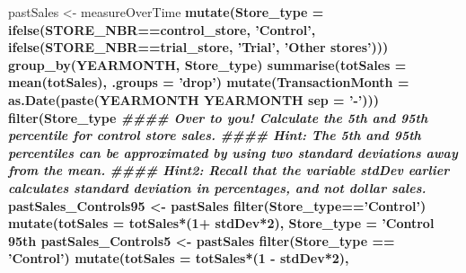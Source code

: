 \documentclass[]{article}
\newenvironment{Shaded}{\begin{snugshade}}{\end{snugshade}}
\newcommand{\CommentTok}[1]{\textcolor[rgb]{0.56,0.35,0.01}{\textit{#1}}}
\newcommand{\DataTypeTok}[1]{\textcolor[rgb]{0.13,0.29,0.53}{#1}}
\newcommand{\DecValTok}[1]{\textcolor[rgb]{0.00,0.00,0.81}{#1}}
\newcommand{\KeywordTok}[1]{\textcolor[rgb]{0.13,0.29,0.53}{\textbf{#1}}}
\newcommand{\NormalTok}[1]{#1}
\newcommand{\OperatorTok}[1]{\textcolor[rgb]{0.81,0.36,0.00}{\textbf{#1}}}
\newcommand{\StringTok}[1]{\textcolor[rgb]{0.31,0.60,0.02}{#1}}
\begin{document}
\begin{Shaded}
\begin{Highlighting}[]
\NormalTok{pastSales <-}\StringTok{ }\NormalTok{measureOverTime }\OperatorTok{%
\StringTok{  }\KeywordTok{mutate}\NormalTok{(}\DataTypeTok{Store_type =} \KeywordTok{ifelse}\NormalTok{(STORE_NBR}\OperatorTok{==}\NormalTok{control_store, }\StringTok{'Control'}\NormalTok{,}
                             \KeywordTok{ifelse}\NormalTok{(STORE_NBR}\OperatorTok{==}\NormalTok{trial_store, }\StringTok{'Trial'}\NormalTok{,}
                                    \StringTok{'Other stores'}\NormalTok{))) }\OperatorTok{%
\StringTok{  }\KeywordTok{group_by}\NormalTok{(YEARMONTH, Store_type) }\OperatorTok{%
\StringTok{  }\KeywordTok{summarise}\NormalTok{(}\DataTypeTok{totSales =} \KeywordTok{mean}\NormalTok{(totSales), }\DataTypeTok{.groups =} \StringTok{'drop'}\NormalTok{) }\OperatorTok{%
\StringTok{  }\KeywordTok{mutate}\NormalTok{(}\DataTypeTok{TransactionMonth =} \KeywordTok{as.Date}\NormalTok{(}\KeywordTok{paste}\NormalTok{(YEARMONTH }\OperatorTok{%
\NormalTok{                                          YEARMONTH }\OperatorTok{%
                                          \DataTypeTok{sep =} \StringTok{'-'}\NormalTok{))) }\OperatorTok{%
\StringTok{  }\KeywordTok{filter}\NormalTok{(Store_type }\OperatorTok{%
\CommentTok{#### Over to you! Calculate the 5th and 95th percentile for control store sales.}
\CommentTok{#### Hint: The 5th and 95th percentiles can be approximated by using two standard deviations away from the mean.}
\CommentTok{#### Hint2: Recall that the variable stdDev earlier calculates standard deviation in percentages, and not dollar sales.}
\NormalTok{pastSales_Controls95 <-}\StringTok{ }\NormalTok{pastSales }\OperatorTok{%
\StringTok{  }\KeywordTok{filter}\NormalTok{(Store_type}\OperatorTok{==}\StringTok{'Control'}\NormalTok{) }\OperatorTok{%
\StringTok{  }\KeywordTok{mutate}\NormalTok{(}\DataTypeTok{totSales =}\NormalTok{ totSales}\OperatorTok{*}\NormalTok{(}\DecValTok{1}\OperatorTok{+}\StringTok{ }\NormalTok{stdDev}\OperatorTok{*}\DecValTok{2}\NormalTok{),}
         \DataTypeTok{Store_type =} \StringTok{'Control 95th %
\NormalTok{pastSales_Controls5 <-}\StringTok{  }\NormalTok{pastSales }\OperatorTok{%
\StringTok{  }\KeywordTok{filter}\NormalTok{(Store_type }\OperatorTok{==}\StringTok{ 'Control'}\NormalTok{) }\OperatorTok{%
\StringTok{  }\KeywordTok{mutate}\NormalTok{(}\DataTypeTok{totSales =}\NormalTok{ totSales}\OperatorTok{*}\NormalTok{(}\DecValTok{1} \OperatorTok{-}\StringTok{ }\NormalTok{stdDev}\OperatorTok{*}\DecValTok{2}\NormalTok{),}
}}}}}}}}}}}}}
\end{Highlighting}
\end{Shaded}
\end{document}
